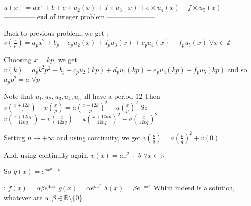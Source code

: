 \begin{solution}
$u(x)=ax^2+b+c\times u_2(x)+d\times u_3(x)+e\times u_4(x)+f\times u_5(x)$
-------------- end of integer problem ---------------------

Back to previous problem, we get : $v(\frac xp)=a_px^2+b_p+c_pu_2(x)+d_pu_3(x)+e_pu_4(x)+f_pu_5(x)$ $\forall x\in\mathbb Z$

Choosing $x=kp$, we get $v(k)=a_pk^2p^2+b_p+c_pu_2(kp)+d_pu_3(kp)+e_pu_4(kp)+f_pu_5(kp)$ and so $a_pp^2=a$ $\forall p$

Note that $u_1,u_2,u_3,u_4,u_5$ all have a period $12$
Then $v(\frac {x+12k}p)-v(\frac xp)=a(\frac{x+12k}p)^2-a(\frac xp)^2$
So $v(\frac {x+12np}{12nq})-v(\frac x{12nq})=a(\frac{x+12np}{12nq})^2-a(\frac x{12nq})^2$

Setting $n\to+\infty$ and using continuity, we get $v(\frac pq)=a(\frac pq)^2+v(0)$

And, using continuity again, $v(x)=ax^2+b$ $\forall x\in\mathbb R$

So $g(x)=e^{ax^2+b}$

 :
$f(x)=\alpha\beta e^{4ax}$
$g(x)=\alpha e^{ax^2}$
$h(x)=\beta e^{-ax^2}$
Which indeed is a solution, whatever are $\alpha,\beta\in\mathbb R\setminus\{0\}$
\end{solution}



